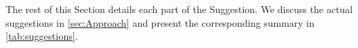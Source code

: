 The rest of this Section details each part of the \textsf{Suggestion}.
We discuss the actual suggestions in \cref{sec:Approach} and present the corresponding summary in \cref{tab:suggestions}.









